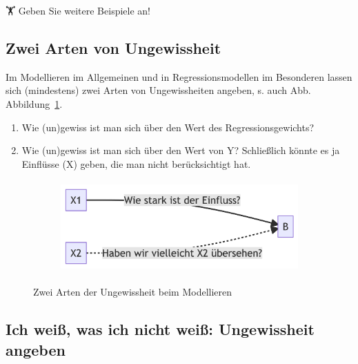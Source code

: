 \documentclass[
  a4paper,
  DIV=11]{scrreprt}
\theoremstyle{definition}
\theoremstyle{remark}
\begin{document}
🏋 Geben Sie weitere Beispiele an!

\hypertarget{zwei-arten-von-ungewissheit}{%
\subsection{Zwei Arten von
Ungewissheit}\label{zwei-arten-von-ungewissheit}}

Im Modellieren im Allgemeinen und in Regressionsmodellen im Besonderen
lassen sich (mindestens) zwei Arten von Ungewissheiten angeben, s. auch
Abb. Abbildung~\ref{fig-zwei-arten}.

\begin{enumerate}
\def\labelenumi{\arabic{enumi}.}
\item
  Wie (un)gewiss ist man sich über den Wert des Regressionsgewichts?
\item
  Wie (un)gewiss ist man sich über den Wert von Y? Schließlich könnte es
  ja Einflüsse (X) geben, die man nicht berücksichtigt hat.
\end{enumerate}

\begin{figure}

{\centering 

\begin{figure}[H]

{\centering \includegraphics[width=3.89in,height=1.39in]{./Inferenz_files/figure-latex/mermaid-figure-2.png}

}

\end{figure}

}

\caption{\label{fig-zwei-arten}Zwei Arten der Ungewissheit beim
Modellieren}

\end{figure}

\hypertarget{ich-weiuxdf-was-ich-nicht-weiuxdf-ungewissheit-angeben}{%
\subsection{Ich weiß, was ich nicht weiß: Ungewissheit
angeben}\label{ich-weiuxdf-was-ich-nicht-weiuxdf-ungewissheit-angeben}}
\end{document}

